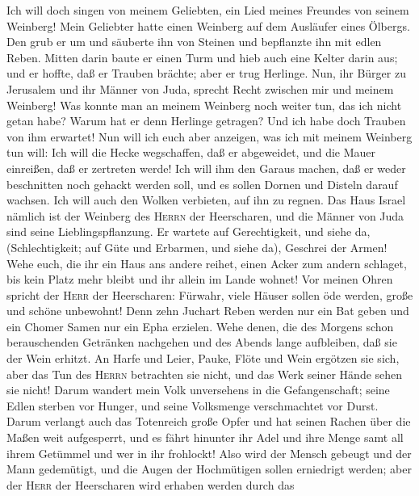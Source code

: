  Ich will doch singen von meinem Geliebten, ein Lied
meines Freundes von seinem Weinberg! Mein Geliebter hatte einen Weinberg
auf dem Ausläufer eines Ölbergs.  Den grub er um und
säuberte ihn von Steinen und bepflanzte ihn mit edlen Reben. Mitten
darin baute er einen Turm und hieb auch eine Kelter darin aus; und er
hoffte, daß er Trauben brächte; aber er trug Herlinge. 
Nun, ihr Bürger zu Jerusalem und ihr Männer von Juda, sprecht Recht
zwischen mir und meinem Weinberg!  Was konnte man an
meinem Weinberg noch weiter tun, das ich nicht getan habe? Warum hat er
denn Herlinge getragen? Und ich habe doch Trauben von ihm erwartet!
 Nun will ich euch aber anzeigen, was ich mit meinem
Weinberg tun will: Ich will die Hecke wegschaffen, daß er abgeweidet,
und die Mauer einreißen, daß er zertreten werde!  Ich will
ihm den Garaus machen, daß er weder beschnitten noch gehackt werden
soll, und es sollen Dornen und Disteln darauf wachsen. Ich will auch den
Wolken verbieten, auf ihn zu regnen.  Das Haus Israel
nämlich ist der Weinberg des \textsc{Herrn} der Heerscharen, und die
Männer von Juda sind seine Lieblingspflanzung. Er wartete auf
Gerechtigkeit, und siehe da, (Schlechtigkeit; auf Güte und Erbarmen, und
siehe da), Geschrei der Armen!  Wehe euch, die ihr ein
Haus ans andere reihet, einen Acker zum andern schlaget, bis kein Platz
mehr bleibt und ihr allein im Lande wohnet!  Vor meinen
Ohren spricht der \textsc{Herr} der Heerscharen: Fürwahr, viele Häuser
sollen öde werden, große und schöne unbewohnt!  Denn zehn
Juchart Reben werden nur ein Bat geben und ein Chomer Samen nur ein Epha
erzielen.  Wehe denen, die des Morgens schon
berauschenden Getränken nachgehen und des Abends lange aufbleiben, daß
sie der Wein erhitzt.  An Harfe und Leier, Pauke, Flöte
und Wein ergötzen sie sich, aber das Tun des \textsc{Herrn} betrachten
sie nicht, und das Werk seiner Hände sehen sie nicht! 
Darum wandert mein Volk unversehens in die Gefangenschaft; seine Edlen
sterben vor Hunger, und seine Volksmenge verschmachtet vor Durst.
 Darum verlangt auch das Totenreich große Opfer und hat
seinen Rachen über die Maßen weit aufgesperrt, und es fährt hinunter ihr
Adel und ihre Menge samt all ihrem Getümmel und wer in ihr frohlockt!
 Also wird der Mensch gebeugt und der Mann gedemütigt,
und die Augen der Hochmütigen sollen erniedrigt werden; 
aber der \textsc{Herr} der Heerscharen wird erhaben werden durch das
